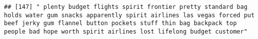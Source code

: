 \documentclass[
]{article}
\begin{document}
\begin{verbatim}
## [147] " plenty budget flights spirit frontier pretty standard bag holds water gum snacks apparently spirit airlines las vegas forced put beef jerky gum flannel button pockets stuff thin bag backpack top people bad hope worth spirit airlines lost lifelong budget customer"                                                                                                                                                                                                                                                                                                                                                                                                                                                                                                                                                                                                                                                                                                                                                                                                                                                                                                                                                                                                                                                                                                                                                                                                                                                                                                                                                                                                                                                                                                                       

\end{verbatim}
\end{document}
